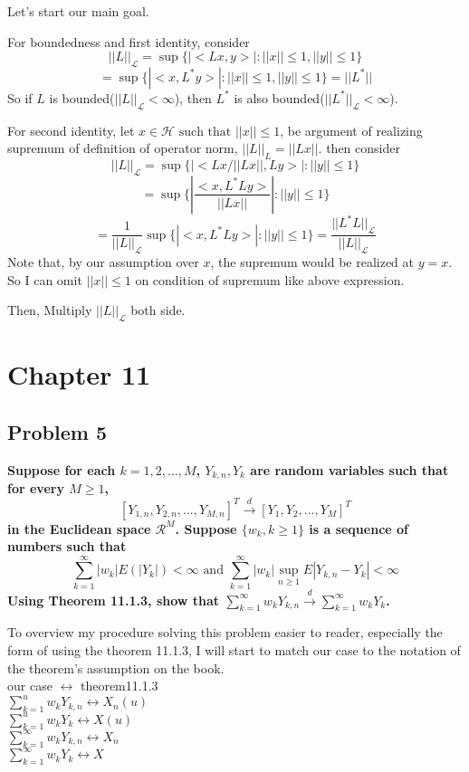 \documentclass{article}
\begin{document}
Let's start our main goal.

For boundedness and first identity, consider
\[||L||_\mathcal{{L}}=\sup\{|<Lx, y>| :||x||\leq 1, ||y||\leq 1\}\]
\[=\sup\{|<x, L^*y>| :||x||\leq 1, ||y||\leq 1\} = ||L^*||\]
So if $L$ is bounded($||L||_\mathcal{L}<\infty$), then $L^*$ is also bounded($||L^*||_\mathcal{L}<\infty$).

For second identity, 
let $x\in \mathcal{H} \text{ such that } ||x||\leq 1$, be argument of realizing supremum of definition of operator norm, \(||L||_{L}=||Lx||\).
then consider
\[||L||_\mathcal{{L}}=\sup\{|<Lx/||Lx||, Ly>| : ||y||\leq 1\}\]
\[=\sup\{|\frac{<x, L^*Ly>}{{||Lx||}}| : ||y||\leq 1\}\]
\[=\frac{1}{||L||_{\mathcal{L}}}\sup\{|<x, L^*Ly>| : ||y||\leq 1\}=\frac{||L^*L||_{\mathcal{L}}}{||L||_{\mathcal{L}}}\]
Note that, by our assumption over $x$, the supremum would be realized at $y=x$. 
So I can omit $||x||\leq1$ on condition of supremum like above expression.

Then, Multiply $||L||_{\mathcal{L}}$ both side.

\newpage
\section{Chapter 11}
\subsection{Problem 5}
\textbf{
    Suppose for each $k=1,2,...,M$, $Y_{k,n}, Y_k$ are random variables such that for every $M\geq 1$,
    \[ [Y_{1,n},Y_{2,n},...,Y_{M,n}]^T\xrightarrow{d} [Y_1,Y_2,...,Y_M]^T\]
    in the Euclidean space $\mathcal{R}^M$. Suppose $\{w_k, k\geq 1\}$ is a sequence of numbers such that
    \[\sum_{k=1}^{\infty}|w_k| E(|Y_k|)<\infty \text{ and } \sum_{k=1}^{\infty}|w_k|\sup_{n\geq 1}E|Y_{k,n}-Y_k|<\infty\]
    Using Theorem 11.1.3, show that \(\sum_{k=1}^{\infty}w_kY_{k,n}\xrightarrow{d}\sum_{k=1}^{\infty}w_kY_k\).
}

To overview my procedure solving this problem easier to reader, especially the form of using the theorem 11.1.3, 
I will start to match our case to the notation of the theorem's assumption on the book. \\
our case $\leftrightarrow$ theorem11.1.3 \\
\(\sum_{k=1}^{u}w_kY_{k,n} \leftrightarrow X_n(u) \) \\
\(\sum_{k=1}^{u}w_kY_{k} \leftrightarrow X(u) \) \\
\(\sum_{k=1}^{\infty}w_kY_{k,n} \leftrightarrow X_n \) \\
\(\sum_{k=1}^{\infty}w_kY_{k} \leftrightarrow X \) \\
\end{document}
